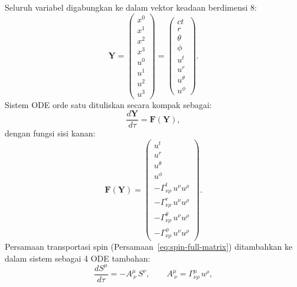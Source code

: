 Seluruh variabel digabungkan ke dalam vektor keadaan
berdimensi 8:
\begin{equation}
    \boxed{
    \mathbf{Y} =
    \begin{pmatrix}
        x^0 \\ x^1 \\ x^2 \\ x^3 \\ u^0 \\ u^1 \\ u^2 \\ u^3
    \end{pmatrix}
    =
    \begin{pmatrix}
        ct \\ r \\ \theta \\ \phi \\ u^t \\ u^r \\ u^\theta \\ u^\phi
    \end{pmatrix}.
    }
    \label{eq:state-vector}
\end{equation}
Sistem ODE orde satu dituliskan secara kompak sebagai:
\begin{equation}
    \frac{d\mathbf{Y}}{d\tau} = \mathbf{F}(\mathbf{Y}),
    \label{eq:ode-compact}
\end{equation}
dengan fungsi sisi kanan:
\begin{equation}
    \mathbf{F}(\mathbf{Y}) =
    \begin{pmatrix}
        u^t \\[2pt]
        u^r \\[2pt]
        u^\theta \\[2pt]
        u^\phi \\[2pt]
        -\Gamma^t_{\nu\rho}\, u^\nu u^\rho \\[2pt]
        -\Gamma^r_{\nu\rho}\, u^\nu u^\rho \\[2pt]
        -\Gamma^\theta_{\nu\rho}\, u^\nu u^\rho \\[2pt]
        -\Gamma^\phi_{\nu\rho}\, u^\nu u^\rho
    \end{pmatrix}.
    \label{eq:F-explicit}
\end{equation}
Persamaan transportasi spin (Persamaan~\ref{eq:spin-full-matrix})
ditambahkan ke dalam sistem sebagai 4 ODE tambahan:
\begin{equation}
    \frac{dS^\mu}{d\tau} = -A^\mu_{\ \nu}\, S^\nu,
    \qquad A^\mu_{\ \nu} = \Gamma^\mu_{\nu\rho}\, u^\rho,
    \label{eq:spin-ode-recap}
\end{equation}
